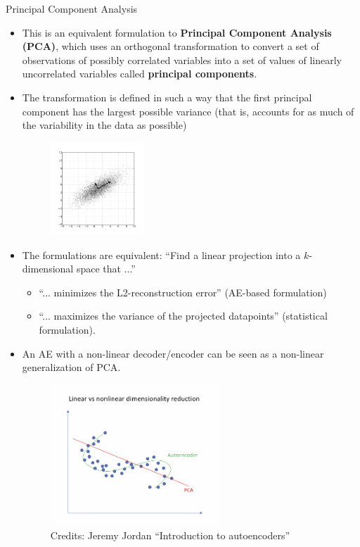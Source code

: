 \begin{vbframe}{Principal Component Analysis}
\begin{itemize}
    \framebreak 

    \item This is an equivalent formulation to \textbf{Principal Component Analysis (PCA)}, which uses an orthogonal transformation to convert a set of observations of possibly correlated variables into a set of values of linearly uncorrelated variables called \textbf{principal components}. 
    \item The transformation is defined in such a way that the first principal component has the largest possible variance (that is, accounts for as much of the variability in the data as possible)    
    \begin{figure}
    \centering
    \includegraphics[width=3.5cm]{plots/PCA.png}
    \end{figure}

    \framebreak 

    \item The formulations are equivalent: \enquote{Find a linear projection into a $k$-dimensional space that ...}
    \begin{itemize}
      \item \enquote{... minimizes the L2-reconstruction error} (AE-based formulation) 
      \item \enquote{... maximizes the variance of the projected datapoints} (statistical formulation). 
    \end{itemize}
  
    \framebreak 

    \item An AE with a non-linear decoder/encoder can be seen as a non-linear generalization of PCA.

    \vspace*{-0.2cm}

    \begin{figure}
    \begin{center}
    \includegraphics[width=0.6\textwidth]{plots/manifold1.png}
    \caption{Credits: Jeremy Jordan \enquote{Introduction to autoencoders}}
    \end{center}
    \end{figure}


\end{itemize}
\end{vbframe}

